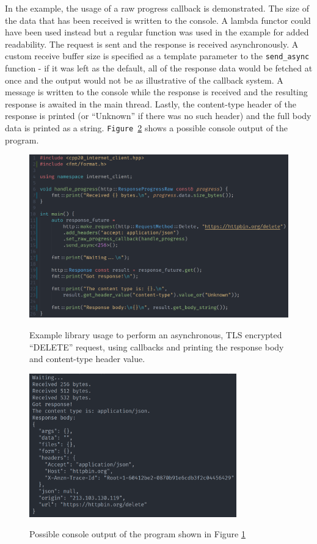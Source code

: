 \documentclass[12pt, a4paper]{article}
\begin{document}
In the example, the usage of a raw progress callback is demonstrated. The size of the data that has been received is written to the console. A lambda functor could have been used instead but a regular function was used in the example for added readability. The request is sent and the response is received asynchronously. A custom receive buffer size is specified as a template parameter to the \texttt{send\_async} function - if it was left as the default, all of the response data would be fetched at once and the output would not be as illustrative of the callback system. A message is written to the console while the response is received and the resulting response is awaited in the main thread. Lastly, the content-type header of the response is printed (or “Unknown” if there was no such header) and the full body data is printed as a string. \texttt{Figure \ref{fig:async_request_output}} shows a possible console output of the program.

\begin{figure}[hp]
	\centering
	\caption{Example library usage to perform an asynchronous, TLS encrypted “DELETE” request, using callbacks and printing the response body and content-type header value.}
	\includegraphics[width=\textwidth]{async_request_example}
	\label{fig:async_request_example}
\end{figure}

\begin{figure}[hp]
	\centering
	\caption{Possible console output of the program shown in Figure \ref{fig:async_request_example}}
	\includegraphics[width=0.8\textwidth]{async_request_output}
	\label{fig:async_request_output}
\end{figure}
\end{document}
